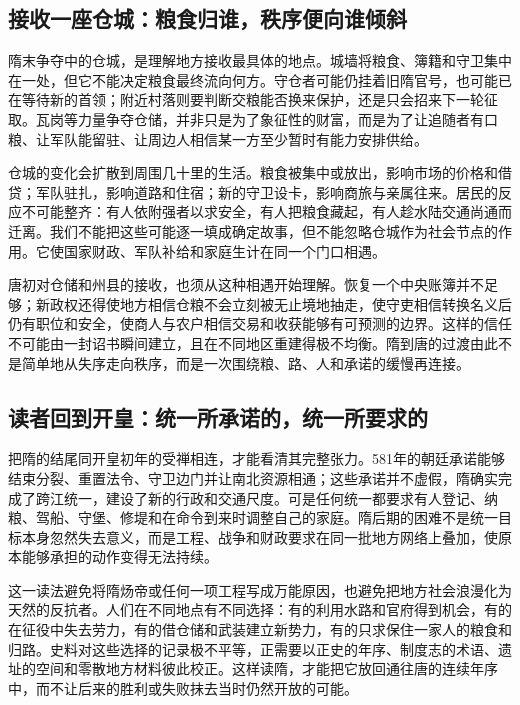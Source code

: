 \subsection{接收一座仓城：粮食归谁，秩序便向谁倾斜}
隋末争夺中的仓城，是理解地方接收最具体的地点。城墙将粮食、簿籍和守卫集中在一处，但它不能决定粮食最终流向何方。守仓者可能仍挂着旧隋官号，也可能已在等待新的首领；附近村落则要判断交粮能否换来保护，还是只会招来下一轮征取。瓦岗等力量争夺仓储，并非只是为了象征性的财富，而是为了让追随者有口粮、让军队能留驻、让周边人相信某一方至少暂时有能力安排供给。

仓城的变化会扩散到周围几十里的生活。粮食被集中或放出，影响市场的价格和借贷；军队驻扎，影响道路和住宿；新的守卫设卡，影响商旅与亲属往来。居民的反应不可能整齐：有人依附强者以求安全，有人把粮食藏起，有人趁水陆交通尚通而迁离。我们不能把这些可能逐一填成确定故事，但不能忽略仓城作为社会节点的作用。它使国家财政、军队补给和家庭生计在同一个门口相遇。

唐初对仓储和州县的接收，也须从这种相遇开始理解。恢复一个中央账簿并不足够；新政权还得使地方相信仓粮不会立刻被无止境地抽走，使守吏相信转换名义后仍有职位和安全，使商人与农户相信交易和收获能够有可预测的边界。这样的信任不可能由一封诏书瞬间建立，且在不同地区重建得极不均衡。隋到唐的过渡由此不是简单地从失序走向秩序，而是一次围绕粮、路、人和承诺的缓慢再连接。

\subsection{读者回到开皇：统一所承诺的，统一所要求的}
把隋的结尾同开皇初年的受禅相连，才能看清其完整张力。581年的朝廷承诺能够结束分裂、重置法令、守卫边门并让南北资源相通；这些承诺并不虚假，隋确实完成了跨江统一，建设了新的行政和交通尺度。可是任何统一都要求有人登记、纳粮、驾船、守堡、修堤和在命令到来时调整自己的家庭。隋后期的困难不是统一目标本身忽然失去意义，而是工程、战争和财政要求在同一批地方网络上叠加，使原本能够承担的动作变得无法持续。

这一读法避免将隋炀帝或任何一项工程写成万能原因，也避免把地方社会浪漫化为天然的反抗者。人们在不同地点有不同选择：有的利用水路和官府得到机会，有的在征役中失去劳力，有的借仓储和武装建立新势力，有的只求保住一家人的粮食和归路。史料对这些选择的记录极不平等，正需要以正史的年序、制度志的术语、遗址的空间和零散地方材料彼此校正。这样读隋，才能把它放回通往唐的连续年序中，而不让后来的胜利或失败抹去当时仍然开放的可能。


